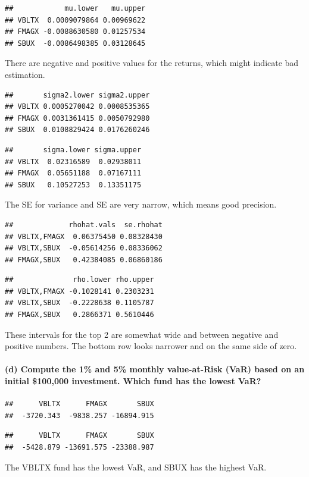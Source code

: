 \documentclass[]{article}
\let\oldparagraph\paragraph
\renewcommand{\paragraph}[1]{\oldparagraph{#1}\mbox{}}
\begin{document}
\begin{verbatim}
##            mu.lower   mu.upper
## VBLTX  0.0009079864 0.00969622
## FMAGX -0.0088630580 0.01257534
## SBUX  -0.0086498385 0.03128645
\end{verbatim}

There are negative and positive values for the returns, which might
indicate bad estimation.

\begin{verbatim}
##       sigma2.lower sigma2.upper
## VBLTX 0.0005270042 0.0008535365
## FMAGX 0.0031361415 0.0050792980
## SBUX  0.0108829424 0.0176260246
\end{verbatim}

\begin{verbatim}
##       sigma.lower sigma.upper
## VBLTX  0.02316589  0.02938011
## FMAGX  0.05651188  0.07167111
## SBUX   0.10527253  0.13351175
\end{verbatim}

The SE for variance and SE are very narrow, which means good precision.

\begin{verbatim}
##             rhohat.vals  se.rhohat
## VBLTX,FMAGX  0.06375450 0.08328430
## VBLTX,SBUX  -0.05614256 0.08336062
## FMAGX,SBUX   0.42384085 0.06860186
\end{verbatim}

\begin{verbatim}
##              rho.lower rho.upper
## VBLTX,FMAGX -0.1028141 0.2303231
## VBLTX,SBUX  -0.2228638 0.1105787
## FMAGX,SBUX   0.2866371 0.5610446
\end{verbatim}

These intervals for the top 2 are somewhat wide and between negative and
positive numbers. The bottom row looks narrower and on the same side of
zero.

\paragraph{(d) Compute the 1\% and 5\% monthly value-at-Risk (VaR) based
on an initial \$100,000 investment. Which fund has the lowest
VaR?}\label{d-compute-the-1-and-5-monthly-value-at-risk-var-based-on-an-initial-100000-investment.-which-fund-has-the-lowest-var}

\begin{verbatim}
##      VBLTX      FMAGX       SBUX 
##  -3720.343  -9838.257 -16894.915
\end{verbatim}

\begin{verbatim}
##      VBLTX      FMAGX       SBUX 
##  -5428.879 -13691.575 -23388.987
\end{verbatim}

The VBLTX fund has the lowest VaR, and SBUX has the highest VaR.
\end{document}
